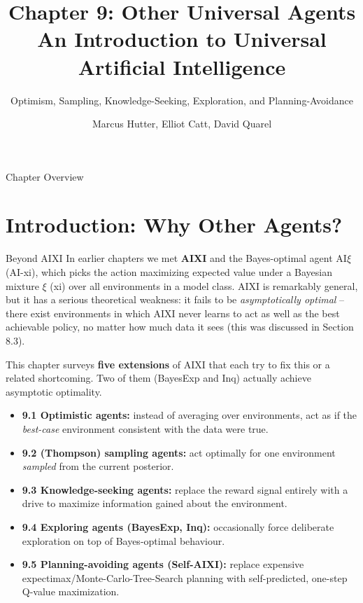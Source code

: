 \documentclass[aspectratio=169,10pt]{beamer}
\title[Ch.\,9 Other Universal Agents]{%
  \textbf{Chapter 9: Other Universal Agents}\\
  \normalsize An Introduction to Universal Artificial Intelligence}
\subtitle{Optimism, Sampling, Knowledge-Seeking, Exploration, and Planning-Avoidance}
\author{Marcus Hutter, Elliot Catt, David Quarel}
\institute{Taylor \& Francis / CRC Press, 2024}
\date{}
\begin{document}
\begin{frame}
  \titlepage
\end{frame}

\begin{frame}{Chapter Overview}
  \tableofcontents
\end{frame}


\section{Introduction: Why Other Agents?}

\begin{frame}{Beyond AIXI}
  In earlier chapters we met \textbf{AIXI} and the Bayes-optimal agent
  $\mathrm{AI}\xi$ (AI-xi), which picks the action maximizing expected value
  under a Bayesian mixture $\xi$ (xi) over all environments in a model class.
  AIXI is remarkably general, but it has a serious theoretical weakness: it
  fails to be \emph{asymptotically optimal} -- there exist environments in
  which AIXI never learns to act as well as the best achievable policy, no
  matter how much data it sees (this was discussed in Section 8.3).

  \vspace{0.4em}
  This chapter surveys \textbf{five extensions} of AIXI that each try to fix
  this or a related shortcoming. Two of them (BayesExp and Inq) actually
  achieve asymptotic optimality.

  \begin{itemize}
    \item \textbf{9.1 Optimistic agents:} instead of averaging over
      environments, act as if the \emph{best-case} environment consistent
      with the data were true.
    \item \textbf{9.2 (Thompson) sampling agents:} act optimally for one
      environment \emph{sampled} from the current posterior.
    \item \textbf{9.3 Knowledge-seeking agents:} replace the reward signal
      entirely with a drive to maximize information gained about the
      environment.
    \item \textbf{9.4 Exploring agents (BayesExp, Inq):} occasionally force
      deliberate exploration on top of Bayes-optimal behaviour.
    \item \textbf{9.5 Planning-avoiding agents (Self-AIXI):} replace
      expensive expectimax/Monte-Carlo-Tree-Search planning with
      self-predicted, one-step Q-value maximization.
  \end{itemize}
\end{frame}
\end{document}
